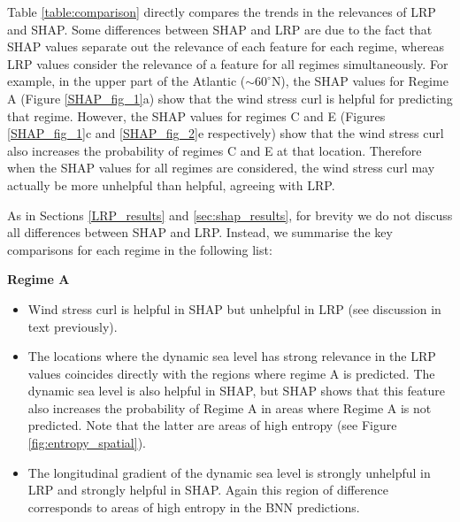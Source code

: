 \documentclass[a4paper]{article}
\begin{document}
Table \ref{table:comparison} directly compares the trends in the relevances of LRP and SHAP. Some differences between SHAP and LRP are due to the fact that SHAP values separate out the relevance of each feature for each regime, whereas LRP values consider the relevance of a feature for all regimes simultaneously. For example, in the upper part of the Atlantic ($\sim 60^{\circ}$N), the SHAP values for Regime A (Figure \ref{SHAP_fig_1}a) show that the wind stress curl is helpful for predicting that regime. However, the SHAP values for regimes C and  E (Figures \ref{SHAP_fig_1}c and \ref{SHAP_fig_2}e respectively) show that the wind stress curl also increases the probability of regimes C and E at that location. Therefore when the SHAP values for all regimes are considered, the wind stress curl may actually be more unhelpful than helpful, agreeing with LRP.

As in Sections \ref{LRP_results} and \ref{sec:shap_results}, for brevity we do not discuss all differences between SHAP and LRP. Instead, we summarise the key comparisons for each regime in the following list:

\vspace{10pt}

\textbf{Regime A}
\begin{itemize}
    \item Wind stress curl is helpful in SHAP but unhelpful in LRP (see discussion in text previously).
    \item The locations where the dynamic sea level has strong relevance in the LRP values coincides directly with the regions where regime A is predicted. The dynamic sea level is also helpful in SHAP, but SHAP shows that this feature also increases the probability of Regime A in areas where Regime A is not predicted. Note that the latter are areas of high entropy (see Figure \ref{fig:entropy_spatial}).
    \item The longitudinal gradient of the dynamic sea level is strongly unhelpful in LRP and strongly helpful in SHAP. Again this region of difference corresponds to areas of high entropy in the BNN predictions.
\end{itemize}
\end{document}
